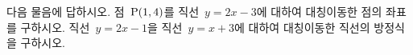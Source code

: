 다음 물음에 답하시오.
 점~$\mathrm{P}(1{,}\mkern3mu\mathopen{}4)$를 직선~$y=2x-3$에 대하여 대칭이동한 점의 좌표를 구하시오.
 직선~$y=2x-1$을 직선~$y=x+3$에 대하여 대칭이동한 직선의 방정식을 구하시오.
